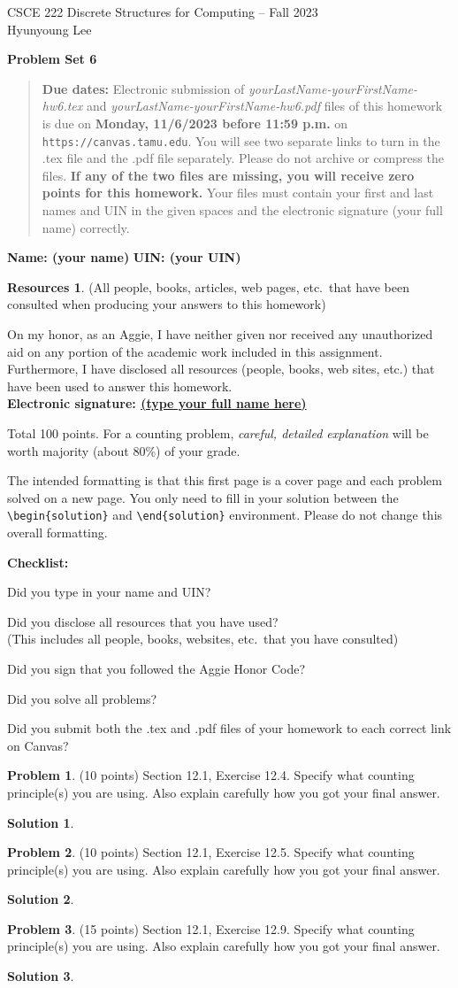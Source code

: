 \documentclass{article}
\theoremstyle{definition}
\newtheorem{problem}{Problem}
\newtheorem*{solution}{Solution}
\newtheorem*{resources}{Resources}
\newcommand{\name}[2]{\noindent\textbf{Name: #1}\hfill \textbf{UIN: #2}
  \newcommand{\myName}{#1}
  \newcommand{\myUIN}{#2}
}
\newcommand{\honor}{\noindent On my honor, as an Aggie, I have neither
  given nor received any unauthorized aid on any portion of the
  academic work included in this assignment. Furthermore, I have
  disclosed all resources (people, books, web sites, etc.) that have
  been used to answer this homework. \\[2ex]
 \textbf{Electronic signature: \underline{ (type your full name here) } } } %
\newcommand{\checklist}{\noindent\textbf{Checklist:}
\begin{compactitem}[$\Box$] 
\item Did you type in your name and UIN? 
\item Did you disclose all resources that you have used? \\
(This includes all people, books, websites, etc.\ that you have consulted)
\item Did you sign that you followed the Aggie Honor Code? 
\item Did you solve all problems? 
\item Did you submit both the .tex and .pdf files of your homework to each correct link on Canvas? 
\end{compactitem}
}
\newcommand{\problemset}[1]{\begin{center}\textbf{Problem Set #1}\end{center}}
\newcommand{\duedate}[1]{\begin{quote}\textbf{Due dates:} Electronic
    submission of \textsl{yourLastName-yourFirstName-hw6.tex} and 
    \textsl{yourLastName-yourFirstName-hw6.pdf} files of this homework is due on
    \textbf{#1} on \texttt{https://canvas.tamu.edu}. You will see two separate links
    to turn in the .tex file and the .pdf file separately. Please do not archive or compress the files.  
    \textbf{If any of the two files are missing, you will receive zero points for this homework.}
    Your files must contain your first and last names and UIN in the given spaces and
    the electronic signature (your full name) correctly.\end{quote} }
\begin{document}
\begin{center}
{\large
CSCE 222 Discrete Structures for Computing -- Fall 2023\\[.5ex]
Hyunyoung Lee\\}
\end{center}
\problemset{6}
\duedate{Monday, 11/6/2023 before 11:59 p.m.}
\name{ (your name) }{ (your UIN) } %

\begin{resources} (All people, books, articles, web pages, etc.\ that
  have been consulted when producing your answers to this homework)
\end{resources}
\honor

\bigskip

\noindent
Total 100 points.  
For a counting problem, \textit{careful, detailed explanation} will be worth majority (about 80\%) 
of your grade.

\bigskip

\noindent
The intended formatting is that this first page is a cover page and each 
problem solved on a new page. You only need to fill in your solution between 
the \verb|\begin{solution}| and \verb|\end{solution}| environment.  
Please do not change this overall formatting.

\vfill
\checklist

\newpage
\begin{problem} (10 points) Section 12.1, Exercise 12.4.  Specify what counting principle(s)
you are using.  Also explain carefully how you got your final answer.
\end{problem}
\begin{solution}
\end{solution}

\newpage
\begin{problem} (10 points) Section 12.1, Exercise 12.5.  Specify what counting principle(s)
you are using.  Also explain carefully how you got your final answer.
\end{problem}
\begin{solution}
\end{solution}

\newpage
\begin{problem} (15 points) Section 12.1, Exercise 12.9.  Specify what counting principle(s)
you are using.  Also explain carefully how you got your final answer.
\end{problem}
\begin{solution}
\end{solution}
\end{document}
